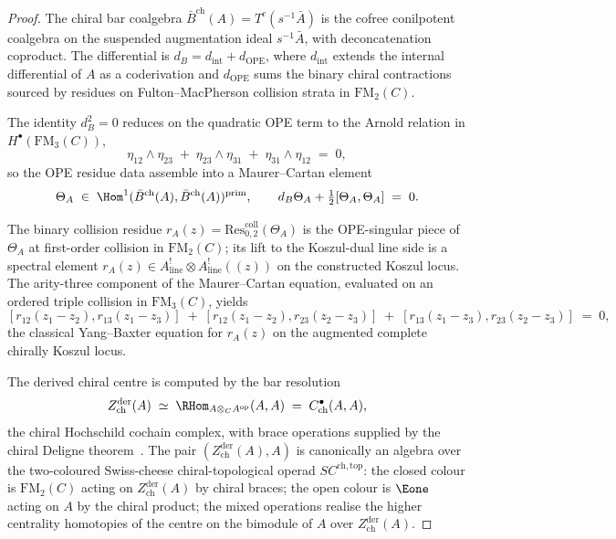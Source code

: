 \begin{proof}
The chiral bar coalgebra $\bar B^{\mathrm{ch}}(A) = T^c(s^{-1} \bar A)$ is the cofree conilpotent coalgebra on the suspended augmentation ideal $s^{-1} \bar A$, with deconcatenation coproduct. The differential is $d_B = d_{\mathrm{int}} + d_{\mathrm{OPE}}$, where $d_{\mathrm{int}}$ extends the internal differential of $A$ as a coderivation and $d_{\mathrm{OPE}}$ sums the binary chiral contractions sourced by residues on Fulton--MacPherson collision strata in $\mathrm{FM}_2(C)$.

The identity $d_B^2 = 0$ reduces on the quadratic OPE term to the Arnold relation in $H^\bullet(\mathrm{FM}_3(C))$,
\[
 \eta_{12} \wedge \eta_{23}
 \;+\;
 \eta_{23} \wedge \eta_{31}
 \;+\;
 \eta_{31} \wedge \eta_{12}
 \;=\;
 0,
\]
so the OPE residue data assemble into a Maurer--Cartan element
\[
 \Theta_A \;\in\; \Hom^1(\bar B^{\mathrm{ch}}(A), \bar B^{\mathrm{ch}}(A))^{\mathrm{prim}},
 \qquad
 d_B \Theta_A + \tfrac{1}{2}[\Theta_A, \Theta_A] \;=\; 0.
\]

The binary collision residue $r_A(z) = \mathrm{Res}^{\mathrm{coll}}_{0, 2}(\Theta_A)$ is the OPE-singular piece of $\Theta_A$ at first-order collision in $\mathrm{FM}_2(C)$; its lift to the Koszul-dual line side is a spectral element $r_A(z) \in A^!_{\mathrm{line}} \otimes A^!_{\mathrm{line}}((z))$ on the constructed Koszul locus. The arity-three component of the Maurer--Cartan equation, evaluated on an ordered triple collision in $\mathrm{FM}_3(C)$, yields
\[
 [r_{12}(z_1 - z_2), r_{13}(z_1 - z_3)]
 \;+\;
 [r_{12}(z_1 - z_2), r_{23}(z_2 - z_3)]
 \;+\;
 [r_{13}(z_1 - z_3), r_{23}(z_2 - z_3)]
 \;=\;
 0,
\]
the classical Yang--Baxter equation for $r_A(z)$ on the augmented complete chirally Koszul locus.

The derived chiral centre is computed by the bar resolution
\[
 Z^{\mathrm{der}}_{\mathrm{ch}}(A)
 \;\simeq\;
 \RHom_{A \otimes_C A^{\mathrm{op}}}(A, A)
 \;=\;
 C^\bullet_{\mathrm{ch}}(A, A),
\]
the chiral Hochschild cochain complex, with brace operations supplied by the chiral Deligne theorem~\cite{CostelloGwilliam2017, Tamarkin2007, BeilinsonDrinfeld}. The pair $(Z^{\mathrm{der}}_{\mathrm{ch}}(A), A)$ is canonically an algebra over the two-coloured Swiss-cheese chiral-topological operad $SC^{\mathrm{ch}, \mathrm{top}}$: the closed colour is $\mathrm{FM}_2(C)$ acting on $Z^{\mathrm{der}}_{\mathrm{ch}}(A)$ by chiral braces; the open colour is $\Eone$ acting on $A$ by the chiral product; the mixed operations realise the higher centrality homotopies of the centre on the bimodule of $A$ over $Z^{\mathrm{der}}_{\mathrm{ch}}(A)$.


\end{proof}
